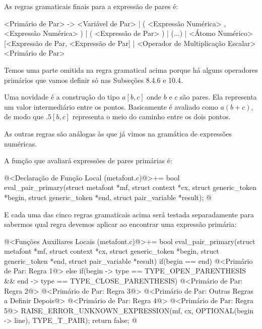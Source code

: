 
As regras gramaticais finais para a expressão de pares é:

\alinhaverbatim
<Primário de Par> -> <Variável de Par> |
                     ( <Expressão Numérica> , <Expressão Numérica> ) |
                     ( <Expressão de Par> ) |
                     (...) |
                     <Átomo Numérico>[<Expressão de Par,
                                      <Expressão de Par]  |
                     <Operador de Multiplicação Escalar><Primário de Par>
\alinhanormal

Temos uma parte omitida na regra gramatical acima porque há alguns
operadores primários que vamos definir só nas Subseções 8.4.6 e 10.4.

Uma novidade é a construção do tipo $a[b, c]$ onde $b$ e $c$ são
pares. Ela representa um valor intermediário entre os
pontos. Basicamente é avaliado como $a(b+c)$, de modo que $.5[b,c]$
representa o meio do caminho entre os dois pontos.

As outras regras são análogas às que já vimos na gramática de
expressões numéricas.

A função que avaliará expressões de pares primárias é:

\iniciocodigo
@<Declaração de Função Local (metafont.c)@>+=
bool eval_pair_primary(struct metafont *mf, struct context *cx,
                       struct generic_token *begin,
                       struct generic_token *end,
                       struct pair_variable *result);
@
\fimcodigo

E cada uma das cinco regras gramaticais acima será testada
separadamente para sabermos qual regra devemos aplicar ao encontrar
uma expressão primária:

\iniciocodigo
@<Funções Auxiliares Locais (metafont.c)@>+=
bool eval_pair_primary(struct metafont *mf, struct context *cx,
                       struct generic_token *begin,
                       struct generic_token *end,
                       struct pair_variable *result){
  if(begin == end){
    @<Primário de Par: Regra 1@>
  }
  else if(begin -> type == TYPE_OPEN_PARENTHESIS &&
          end -> type == TYPE_CLOSE_PARENTHESIS){
    @<Primário de Par: Regra 2@>
    @<Primário de Par: Regra 3@>
  }
  @<Primário de Par: Outras Regras a Definir Depois@>
  @<Primário de Par: Regra 4@>
  @<Primário de Par: Regra 5@>
  RAISE_ERROR_UNKNOWN_EXPRESSION(mf, cx, OPTIONAL(begin -> line), TYPE_T_PAIR);
  return false;
}
@

